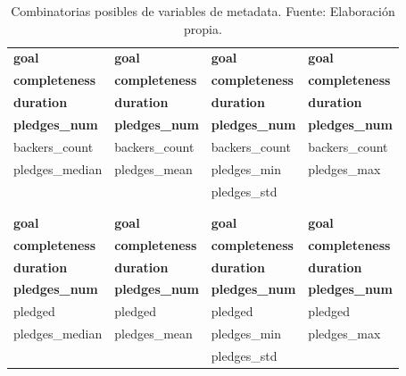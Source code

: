 \begin{table}[h!]
	\centering
	\small
	\begin{tabular}{ |m{3.5cm}|m{3.5cm}|m{3.5cm}|m{3.5cm}  }
		\hline
		\rowcolor{bluejean}
		\Centering \color{white}{Combinación 1}& \Centering \color{white}{Combinación 2}& \Centering \color{white}{Combinación 3}& \Centering \color{white}{Combinación 4}
		\\
		\hline
		\textbf{goal} & \textbf{goal} & \textbf{goal} & \textbf{goal} \\
		\hline
		\textbf{completeness} & \textbf{completeness} & \textbf{completeness} & \textbf{completeness} \\
		\hline
		\textbf{duration} & \textbf{duration} &	\textbf{duration} & \textbf{duration} \\
		\hline
		\textbf{pledges\_num} & \textbf{pledges\_num} & \textbf{pledges\_num} & \textbf{pledges\_num} \\
		\hline
		backers\_count & backers\_count & backers\_count & backers\_count \\
		\hline
		pledges\_median & pledges\_mean & pledges\_min & pledges\_max \\
		\hline
		 &  & pledges\_std &  \\
		\hline
		\rowcolor{turq}
		\multicolumn{4}{c}{ } \\
		\hline
		\rowcolor{bluejean}
		\Centering \color{white}{Combinación 5}& \Centering \color{white}{Combinación 6}&
		\Centering \color{white}{Combinación 7}& \Centering \color{white}{Combinación 8}
		\\
		\hline
		\textbf{goal} & \textbf{goal} & \textbf{goal} & \textbf{goal} \\
		\hline
		\textbf{completeness} & \textbf{completeness} & \textbf{completeness} & \textbf{completeness} \\
		\hline
		\textbf{duration} & \textbf{duration} &	\textbf{duration} & \textbf{duration} \\
		\hline
		\textbf{pledges\_num} & \textbf{pledges\_num} & \textbf{pledges\_num} & \textbf{pledges\_num} \\
		\hline
		pledged & pledged & pledged & pledged \\
		\hline
		pledges\_median & pledges\_mean & pledges\_min & pledges\_max \\
		\hline
		 &  & pledges\_std &  \\
		\hline
	\end{tabular}
	\caption{Combinatorias posibles de variables de metadata. Fuente: Elaboración propia.}
	\label{4:table2}
\end{table}

